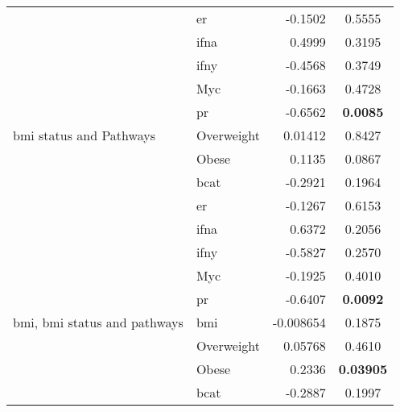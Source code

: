 \begin{table}[htpb]
\begin{threeparttable}
\begin{tabular}{llrc}
                                                                           & \gls{er}   & -0.1502   & 0.5555 \\
                                                                           & \gls{ifna} & 0.4999    & 0.3195 \\
                                                                           & \gls{ifny} & -0.4568   & 0.3749 \\
                                                                           & Myc        & -0.1663   & 0.4728 \\
                                                                           & \gls{pr}   & -0.6562   & \bfseries 0.0085  \\
				\hline
				\rule{0pt}{2.25ex}\gls{bmi} status and Pathways            & Overweight & 0.01412   & 0.8427  \\
                                                                           & Obese      & 0.1135    & 0.0867  \\
                                                                           & \gls{bcat} & -0.2921   & 0.1964  \\
                                                                           & \gls{er}   & -0.1267   & 0.6153  \\
                                                                           & \gls{ifna} & 0.6372    & 0.2056  \\
                                                                           & \gls{ifny} & -0.5827   & 0.2570  \\
                                                                           & Myc        & -0.1925   & 0.4010  \\
                                                                           & \gls{pr}   & -0.6407   & \bfseries 0.0092   \\
				\hline
				\rule{0pt}{2.25ex}\gls{bmi}, \gls{bmi} status and pathways & \gls{bmi}  & -0.008654 & 0.1875 \\
                                                                           & Overweight & 0.05768   & 0.4610 \\
                                                                           & Obese      & 0.2336    & \bfseries 0.03905  \\
                                                                           & \gls{bcat} & -0.2887   & 0.1997 \\

\end{tabular}
\end{threeparttable}
\end{table}
